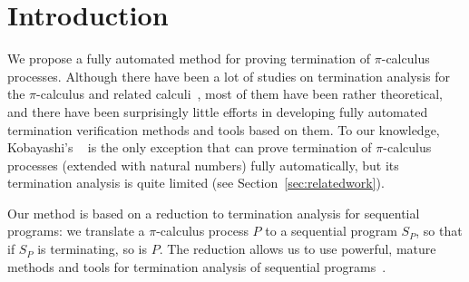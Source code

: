 \section{Introduction}  \label{sec:introduction}

\newcommand\inexpIntro[3]{#1?(#2,#3).}
\newcommand\rinexpIntro[3]{*#1?(#2,#3).}
\newcommand\outexpIntro[3]{#1!(#2,#3).}
\newcommand\outatomIntro[3]{#1!(#2,#3)}

We propose a fully automated method for proving termination of \(\pi\)-calculus processes.
Although there have been a lot of studies on termination analysis for the \(\pi\)-calculus
and related calculi~\cite{Deng06IC,Demangeon07,SangiorgiTermination,KobayashiHybrid,Yoshida04IC,DBLP:journals/jlp/DemangeonHS10,Venet98SAS}, most of them have been rather theoretical,
and there have been surprisingly little efforts in developing  fully automated termination
verification methods and tools based on them. To our knowledge,
Kobayashi's \typical{}~\cite{TyPiCal,KobayashiHybrid} is the only exception that
can prove termination of \(\pi\)-calculus processes (extended with natural numbers)
fully automatically, but its termination analysis is quite limited (see Section~\ref{sec:relatedwork}).

Our method is based on a reduction to termination analysis for sequential programs:
we translate a \(\pi\)-calculus process \(P\) to a sequential program \(S_P\), so that
if \(S_P\) is terminating, so is \(P\). The reduction allows us to use
powerful, mature methods and tools
for termination analysis of sequential programs~\cite{heizmann2016ultimate,freqterm,DBLP:conf/lics/PodelskiR04,Kuwahara2014Termination,DBLP:journals/cacm/CookPR11}.

